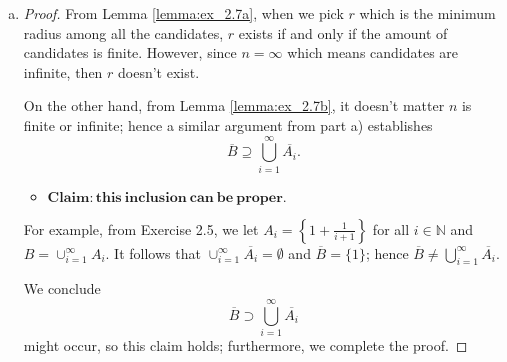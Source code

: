 \begin{Exercise}
\begin{enumerate}[a)]
\begin{proof}
For $n=1$, if $B_1 = A_1$, then $\overline{B_1} = \overline{A_1}$ holds.

Suppose for $n=k$, 
$$
B_k = \bigcup_{i=1}^{k}A_i \implies \overline{B_k} = \bigcup_{i=1}^{k}\overline{A_i}.
$$
Then for $n=k+1$, if $B_{k+1} = \bigcup_{i=1}^{k+1}A_i$, then we have
\begin{align*}
\overline{B_{k+1}}
&= \overline{\cup_{i=1}^{k+1}A_i} \\
&= \overline{\left( \cup_{i=1}^{k}A_i \right) \cup A_{k+1}} \\
&= \overline{\cup_{i=1}^{k}A_i} \cup \overline{A_{k+1}} \\
&= \overline{B_k} \cup \overline{A_{k+1}} \\
&= \left( \cup_{i=1}^{k}\overline{A_i} \right) \cup \overline{A_{k+1}} \\
&= \cup_{i=1}^{k+1}\overline{A_i}
\end{align*}
also holds. 

By induction, we conclude the formula holds for all $n\in\mathbb{N}$.
\end{proof}

\item
\begin{proof}
From Lemma \ref{lemma:ex_2.7a}, when we pick $r$ which is the minimum radius among all the candidates, $r$ exists if and only if the amount of candidates is finite. However, since $n=\infty$ which means candidates are infinite, then $r$ doesn't exist.

On the other hand, from Lemma \ref{lemma:ex_2.7b}, it doesn't matter $n$ is finite or infinite; hence a similar argument from part a) establishes
$$
\overline{B} \supseteq \bigcup_{i=1}^{\infty}\overline{A_i}.
$$

\begin{itemize}
\item $\mathbf{Claim:this\ inclusion\ can\ be\ proper.}$
\end{itemize}

For example, from Exercise 2.5, we let $A_i = \left\{ 1+\frac{1}{i+1} \right\}$ for all $i\in\mathbb{N}$ and $B=\cup_{i=1}^{\infty} A_i$. It follows that $\cup_{i=1}^{\infty}\overline{A_i} = \emptyset$ and $\overline{B} = \{1\}$; hence $\overline{B} \neq \bigcup_{i=1}^{\infty}\overline{A_i}$.

We conclude
$$
\overline{B} \supset \bigcup_{i=1}^{\infty}\overline{A_i}
$$
might occur, so this claim holds; furthermore, we complete the proof.
\end{proof}
\end{enumerate}
\end{Exercise}